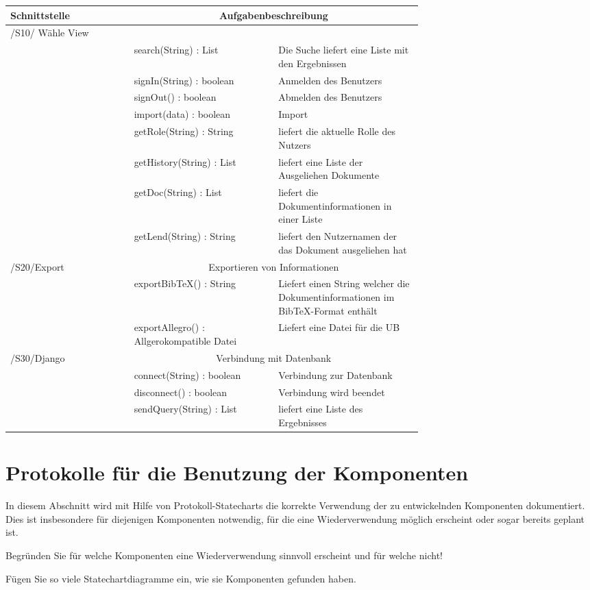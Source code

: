 \begin{tabular}[ht]{|l|p{0.35\linewidth}|p{0.35\linewidth}|}
\hline
Schnittstelle & \multicolumn{2}{|c|}{Aufgabenbeschreibung}\\
\hline
\hline
/S10/ Wähle View & \multicolumn{2}{|c|}{}\\
\hline
& search(String) : List & Die Suche liefert eine Liste mit den Ergebnissen\\
& signIn(String) : boolean & Anmelden des Benutzers\\
& signOut() : boolean & Abmelden des Benutzers\\
& import(data) : boolean & Import \\
& getRole(String) : String & liefert die aktuelle Rolle des Nutzers\\
& getHistory(String) : List & liefert eine Liste der Ausgeliehen Dokumente\\
& getDoc(String) : List & liefert die Dokumentinformationen in einer Liste\\
& getLend(String) : String & liefert den Nutzernamen der das Dokument ausgeliehen hat\\
\hline
/S20/Export & \multicolumn{2}{|c|}{Exportieren von Informationen}\\
\hline
& exportBibTeX() : String & Liefert einen String welcher die Dokumentinformationen im BibTeX-Format enthält\\
& exportAllegro() : Allgerokompatible Datei & Liefert eine Datei für die UB\\
\hline
/S30/Django & \multicolumn{2}{|c|}{Verbindung mit Datenbank}\\
\hline
& connect(String) : boolean & Verbindung zur Datenbank\\
& disconnect() : boolean & Verbindung wird beendet\\
& sendQuery(String) : List & liefert eine Liste des Ergebnisses\\
\hline
\end{tabular}





\section{Protokolle für die Benutzung der Komponenten}

In diesem Abschnitt wird mit Hilfe von Protokoll-Statecharts die korrekte
Verwendung der zu entwickelnden Komponenten dokumentiert. Dies ist insbesondere
für diejenigen Komponenten notwendig, für die eine Wiederverwendung möglich
erscheint oder sogar bereits geplant ist.

Begründen Sie für welche Komponenten eine Wiederverwendung sinnvoll erscheint
und für welche nicht!

Fügen Sie so viele Statechartdiagramme ein, wie sie Komponenten gefunden haben.
